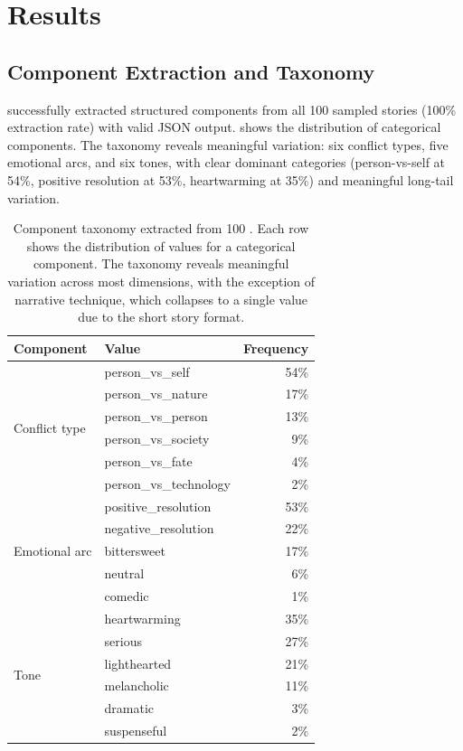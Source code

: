 \section{Results}
\label{sec:results}

\subsection{Component Extraction and Taxonomy}
\label{sec:results_taxonomy}

\gptfour successfully extracted structured components from all 100 sampled stories (100\% extraction rate) with valid JSON output.
 shows the distribution of categorical components.
The taxonomy reveals meaningful variation: six conflict types, five emotional arcs, and six tones, with clear dominant categories (person-vs-self at 54\%, positive resolution at 53\%, heartwarming at 35\%) and meaningful long-tail variation.

\begin{table}[t]
    \centering
    \caption{Component taxonomy extracted from 100 \rocstories. Each row shows the distribution of values for a categorical component. The taxonomy reveals meaningful variation across most dimensions, with the exception of narrative technique, which collapses to a single value due to the short story format.}
    \begin{tabular}{@{}llr@{}}
        \toprule
        \textbf{Component} & \textbf{Value} & \textbf{Frequency} \\
        \midrule
        \multirow{6}{*}{Conflict type} & person\_vs\_self & 54\% \\
        & person\_vs\_nature & 17\% \\
        & person\_vs\_person & 13\% \\
        & person\_vs\_society & 9\% \\
        & person\_vs\_fate & 4\% \\
        & person\_vs\_technology & 2\% \\
        \midrule
        \multirow{5}{*}{Emotional arc} & positive\_resolution & 53\% \\
        & negative\_resolution & 22\% \\
        & bittersweet & 17\% \\
        & neutral & 6\% \\
        & comedic & 1\% \\
        \midrule
        \multirow{6}{*}{Tone} & heartwarming & 35\% \\
        & serious & 27\% \\
        & lighthearted & 21\% \\
        & melancholic & 11\% \\
        & dramatic & 3\% \\
        & suspenseful & 2\% \\
        \bottomrule
    \end{tabular}
    \label{tab:taxonomy}
\end{table}

